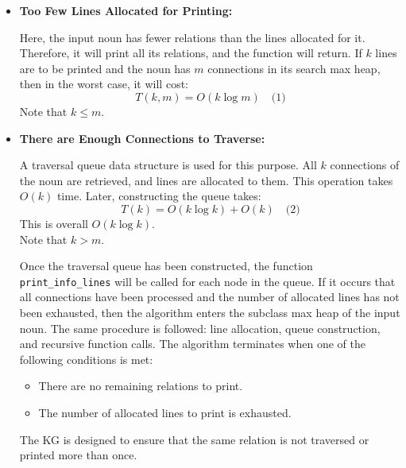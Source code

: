 \documentclass[conference]{IEEEtran}
\begin{document}
\begin{itemize}
    \item \textbf{Too Few Lines Allocated for Printing:}
    
    Here, the input noun has fewer relations than the lines allocated for it. Therefore, it will print all its relations, and the function will return. If \( k \) lines are to be printed and the noun has \( m \) connections in its search max heap, then in the worst case, it will cost:
    \[
    T(k, m) = O(k \log m) \quad \text{(1)}
    \]
    Note that \( k \leq m \).
    
    \item \textbf{There are Enough Connections to Traverse:}
    
    A traversal queue data structure is used for this purpose. All \( k \) connections of the noun are retrieved, and lines are allocated to them. This operation takes \( O(k) \) time. Later, constructing the queue takes:
    \[
    T(k) = O(k \log k) + O(k) \quad \text{(2)}
    \]
    This is overall \( O(k \log k) \).
    \\
    Note that \( k > m \).
    
    Once the traversal queue has been constructed, the function \texttt{print\_info\_lines} will be called for each node in the queue. If it occurs that all connections have been processed and the number of allocated lines has not been exhausted, then the algorithm enters the subclass max heap of the input noun. The same procedure is followed: line allocation, queue construction, and recursive function calls. The algorithm terminates when one of the following conditions is met:
    \begin{itemize}
        \item There are no remaining relations to print.
        \item The number of allocated lines to print is exhausted.
    \end{itemize}
    
    The KG is designed to ensure that the same relation is not traversed or printed more than once.
\end{itemize}


\\
\end{document}
